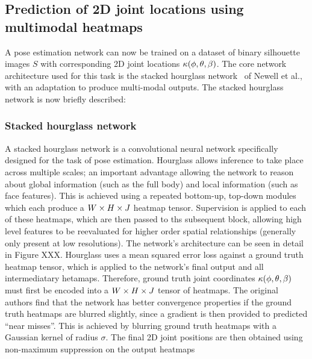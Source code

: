 
\subsection{Prediction of 2D joint locations using multimodal heatmaps}



A pose estimation network can now be trained on a dataset of binary silhouette images $S$ with corresponding 2D joint locations $\kappa(\phi,\theta,\beta)$. The core network architecture used for this task is the stacked hourglass network~\cite{newell2016stacked} of Newell et al., with an adaptation to produce multi-modal outputs. The stacked hourglass network is now briefly described:

\subsubsection{Stacked hourglass network}

A stacked hourglass network is a convolutional neural network specifically designed for the task of pose estimation. Hourglass allows inference to take place across multiple scales; an important advantage allowing the network to reason about global information (such as the full body) and local information (such as face features). This is achieved using a repeated bottom-up, top-down modules which each produce a $W \times H \times J$ heatmap tensor. Supervision is applied to each of these heatmaps, which are then passed to ths subsequent block, allowing high level features to be reevaluated for higher order spatial relationships (generally only present at low resolutions). The network's architecture can be seen in detail in Figure XXX. Hourglass uses a mean squared error loss against a ground truth heatmap tensor, which is applied to the network's final output and all intermediatary hetamaps. Therefore, ground truth joint coordinates $\kappa(\phi,\theta,\beta)$ must first be encoded into a $W \times H \times J$ tensor of heatmaps. The original authors find that the network has better convergence properties if the ground truth heatmaps are blurred slightly, since a gradient is then provided to predicted ``near misses''. This is achieved by blurring ground truth heatmaps with a Gaussian kernel of radius $\sigma$. The final 2D joint positions are then obtained using non-maximum suppression on the output heatmaps

